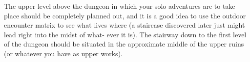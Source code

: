 

The upper level above the dungeon in which your solo adventures
are to take place should be completely planned out, and it is a good
idea to use the outdoor encounter matrix to see what lives where (a
staircase discovered later just might lead right into the midst of what-
ever it is). The stairway down to the first level of the dungeon should
be situated in the approximate middle of the upper ruins (or whatever
you have as upper works).




